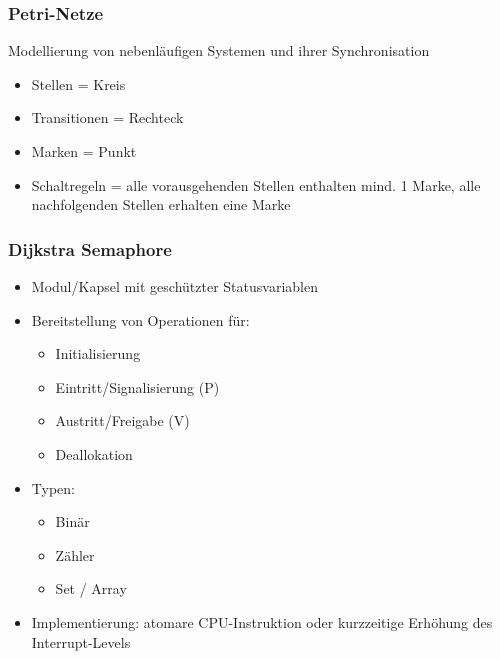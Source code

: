 \documentclass[a4paper, 10pt]{article}
\begin{document}
\subsubsection{Petri-Netze}
Modellierung von nebenl\"aufigen Systemen und ihrer Synchronisation
\begin{itemize}
	\item Stellen = Kreis
	\item Transitionen = Rechteck
	\item Marken = Punkt
	\item Schaltregeln = alle vorausgehenden Stellen enthalten mind. 1 Marke, alle nachfolgenden Stellen erhalten eine Marke
\end{itemize}

\subsubsection{Dijkstra Semaphore}
\begin{itemize}
	\item Modul/Kapsel mit gesch\"utzter Statusvariablen
	\item Bereitstellung von Operationen f\"ur:
		\begin{itemize}
				\item Initialisierung
				\item Eintritt/Signalisierung (P)
				\item Austritt/Freigabe (V)
				\item Deallokation
		\end{itemize}
	\item Typen:
		\begin{itemize}
			\item Bin\"ar	
			\item Z\"ahler
			\item Set / Array
		\end{itemize}
	\item Implementierung: atomare CPU-Instruktion oder kurzzeitige Erhöhung des Interrupt-Levels
\end{itemize}
\end{document}
